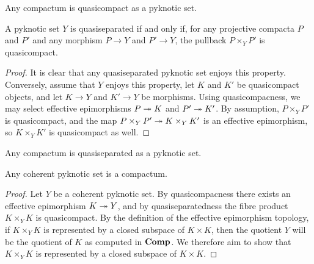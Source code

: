 \begin{cor}
	Any compactum is quasicompact as a pyknotic set.
\end{cor}

\begin{lem}
	A pyknotic set $ Y $ is quasiseparated if and only if, for any projective compacta $ P $ and $ P' $ and any morphism $ P \to Y $ and $ P' \to Y $, the pullback $ P \times_Y P' $ is quasicompact.
\end{lem}

\begin{proof}
	It is clear that any quasiseparated pyknotic set enjoys this property.
	Conversely, assume that $ Y $ enjoys this property, let $ K $ and $ K' $ be quasicompact objects, and let $ K \to Y $ and $ K' \to Y $ be morphisms.
	Using quasicompacness, we may select effective epimorphisms $ P \twoheadrightarrow K $ and $ P' \twoheadrightarrow K' $.
	By assumption, $ P \times_Y P' $ is quasicompact, and the map $ P \times_Y P' \twoheadrightarrow K \times_Y K' $ is an effective epimorphism, so $ K \times_Y K' $ is quasicompact as well.
\end{proof}

\begin{cor}
	Any compactum is quasiseparated as a pyknotic set.
\end{cor}

\begin{prp}
	Any coherent pyknotic set is a compactum.
\end{prp}

\begin{proof}
	Let $ Y $ be a coherent pyknotic set.
	By quasicompacness there exists an effective epimorphism $ K \twoheadrightarrow Y $, and by quasiseparatedness the fibre product $ K \times_Y K $ is quasicompact.
	By the definition of the effective epimorphism topology, if $ K \times_Y K $ is represented by a closed subspace of $ K \times K $, then the quotient $ Y $ will be the quotient of $ K $ as computed in $ \textbf{\textup{Comp}} $.
	We therefore aim to show that $ K \times_Y K $ is represented by a closed subspace of $ K \times K $.

\end{proof}


